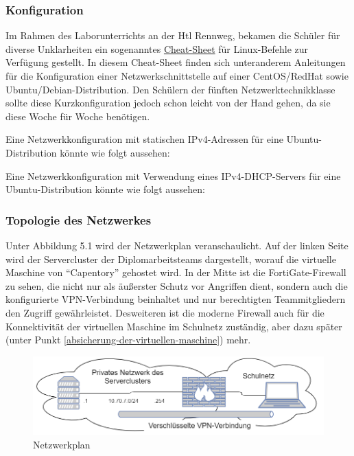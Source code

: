 \hypertarget{konfiguration}{%
\subsubsection{Konfiguration}\label{konfiguration}}

Im Rahmen des Laborunterrichts an der Htl Rennweg, bekamen die Schüler
für diverse Unklarheiten ein sogenanntes
\href{https://netzwerktechnik.htl.rennweg.at/~zai/Fachschule/NWT_Stamm_Foerderkurs/Survival_Guide_Linux_Network_Configuration.pdf}{Cheat-Sheet}
für Linux-Befehle zur Verfügung gestellt. In diesem Cheat-Sheet finden
sich unteranderem Anleitungen für die Konfiguration einer
Netzwerkschnittstelle auf einer CentOS/RedHat sowie
Ubuntu/Debian-Distribution. Den Schülern der fünften
Netzwerktechnikklasse sollte diese Kurzkonfiguration jedoch schon leicht
von der Hand gehen, da sie diese Woche für Woche benötigen.

Eine Netzwerkkonfiguration mit statischen IPv4-Adressen für eine
Ubuntu-Distribution könnte wie folgt aussehen:

Eine Netzwerkkonfiguration mit Verwendung eines IPv4-DHCP-Servers für
eine Ubuntu-Distribution könnte wie folgt aussehen:

\hypertarget{topologie-des-netzwerkes}{%
\subsubsection{Topologie des
Netzwerkes}\label{topologie-des-netzwerkes}}

Unter Abbildung 5.1 wird der Netzwerkplan veranschaulicht. Auf der
linken Seite wird der Servercluster der Diplomarbeitsteams dargestellt,
worauf die virtuelle Maschine von ``Capentory'' gehostet wird. In der
Mitte ist die FortiGate-Firewall zu sehen, die nicht nur als äußerster
Schutz vor Angriffen dient, sondern auch die konfigurierte
VPN-Verbindung beinhaltet und nur berechtigten Teammitgliedern den
Zugriff gewährleistet. Desweiteren ist die moderne Firewall auch für die
Konnektivität der virtuellen Maschine im Schulnetz zuständig, aber dazu
später (unter Punkt \ref{absicherung-der-virtuellen-maschine}) mehr.
\begin{figure}[ht]
\centering
\includegraphics{topo1.png}
\caption{Netzwerkplan}
\end{figure}

